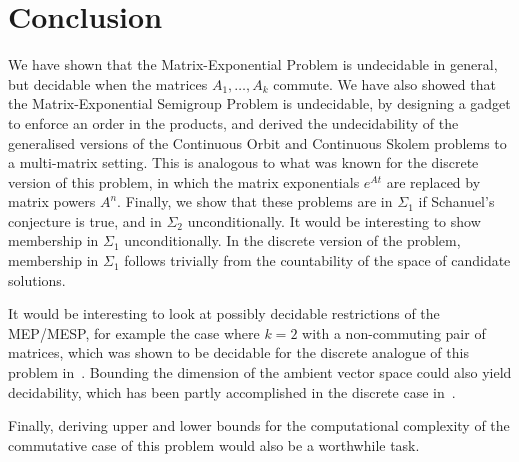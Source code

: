\section{Conclusion}

We have shown that the Matrix-Exponential Problem is undecidable in general, but decidable when the matrices $A_{1}, \ldots, A_{k}$ commute. We have also showed that the Matrix-Exponential Semigroup Problem is undecidable, by designing a gadget to enforce an order in the products, and derived the undecidability of the generalised versions of the Continuous Orbit and Continuous Skolem problems to a multi-matrix setting. This is analogous to what was known for the discrete version of this problem, in which the matrix exponentials $e^{At}$ are replaced by matrix powers $A^n$. Finally, we show that these problems are in $\Sigma_{1}$ if Schanuel's conjecture is true, and in $\Sigma_{2}$ unconditionally. It would be interesting to show membership in $\Sigma_{1}$ unconditionally. In the discrete version of the problem, membership in $\Sigma_{1}$ follows trivially from the countability of the space of candidate solutions.

It would be interesting to look at possibly decidable restrictions of the MEP/MESP, for example the case where $k=2$ with a non-commuting pair of matrices, which was shown to be decidable for the discrete analogue of this problem in~\cite{MEHTP}. Bounding the dimension of the ambient vector space could also yield decidability, which has been partly accomplished in the discrete case in~\cite{PS2Z}.

Finally, deriving upper and lower bounds for the computational complexity of the commutative case of this problem would also be a worthwhile task.
